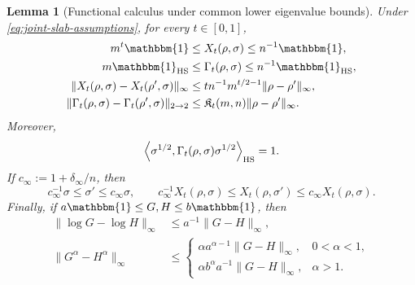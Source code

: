 \documentclass[11pt]{article}
\newtheorem{lemma}[lemma]{Lemma}
\theoremstyle{remark}
\newcommand{\1}{\mathbbm{1}}
\begin{document}
\begin{lemma}[Functional calculus under common lower eigenvalue bounds]
\label{lemma:joint-slab-functional-calculus}
Under \eqref{eq:joint-slab-assumptions}, for every $t\in[0,1]$,
\begin{align}
 m^t\1&\leq X_t(\rho,\sigma)\leq n^{-1}\1,
 \label{eq:joint-slab-X-spectrum}\\
 m\1_{\rm HS}&\leq\Gamma_t(\rho,\sigma)
                    \leq n^{-1}\1_{\rm HS},
 \label{eq:joint-slab-Gamma-spectrum}\\
 \lVert X_t(\rho,\sigma)-X_t(\rho',\sigma)\rVert_\infty
 &\leq tn^{-1}m^{t/2-1}
          \lVert\rho-\rho'\rVert_\infty,
 \label{eq:joint-slab-X-first-input}\\
 \lVert\Gamma_t(\rho,\sigma)
       -\Gamma_t(\rho',\sigma)\rVert_{2\to2}
 &\leq\mathfrak K_t(m,n)
          \lVert\rho-\rho'\rVert_\infty.
 \label{eq:joint-slab-Gamma-first-input}
\end{align}
Moreover,
\begin{equation}
 \left\langle\sigma^{1/2},
 \Gamma_t(\rho,\sigma)\sigma^{1/2}\right\rangle_{\rm HS}=1.
 \label{eq:joint-slab-first-moment}
\end{equation}
If $c_\infty:=1+\delta_\infty/n$, then
\begin{equation}
 c_\infty^{-1}\sigma\leq\sigma'\leq c_\infty\sigma,
 \qquad
 c_\infty^{-1}X_t(\rho,\sigma)
 \leq X_t(\rho,\sigma')
 \leq c_\infty X_t(\rho,\sigma).
 \label{eq:joint-slab-order-comparison}
\end{equation}
Finally, if $a\1\leq G,H\leq b\1$, then
\begin{align}
 \lVert\log G-\log H\rVert_\infty
 &\leq a^{-1}\lVert G-H\rVert_\infty,
 \label{eq:joint-slab-log-Lipschitz}\\
 \lVert G^\alpha-H^\alpha\rVert_\infty
 &\leq
 \begin{cases}
  \alpha a^{\alpha-1}\lVert G-H\rVert_\infty,
      &0<\alpha<1,\\
  \alpha b^\alpha a^{-1}\lVert G-H\rVert_\infty,
      &\alpha>1.
 \end{cases}
 \label{eq:joint-slab-power-Lipschitz}
\end{align}
\end{lemma}
\end{document}
